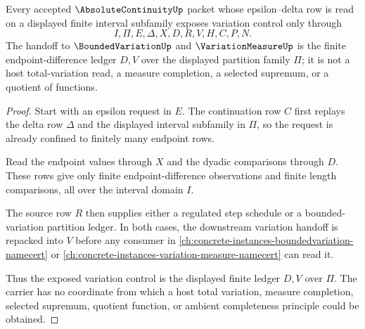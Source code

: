 \begin{theorem}
\label{thm:absolute-continuity-finite-variation-control}
Every accepted $\AbsoluteContinuityUp$ packet whose epsilon--delta row is read on a displayed finite interval subfamily exposes variation control only through
$$
I,\Pi,E,\Delta,X,D,R,V,H,C,P,N .
$$
The handoff to $\BoundedVariationUp$ and $\VariationMeasureUp$ is the finite endpoint-difference ledger $D,V$ over the displayed partition family $\Pi$; it is not a host total-variation read, a measure completion, a selected supremum, or a quotient of functions.
\end{theorem}
\begin{proof}
Start with an epsilon request in $E$. The continuation row $C$ first replays the delta row $\Delta$ and the displayed interval subfamily in $\Pi$, so the request is already confined to finitely many endpoint rows.

Read the endpoint values through $X$ and the dyadic comparisons through $D$. These rows give only finite endpoint-difference observations and finite length comparisons, all over the interval domain $I$.

The source row $R$ then supplies either a regulated step schedule or a bounded-variation partition ledger. In both cases, the downstream variation handoff is repacked into $V$ before any consumer in \autoref{ch:concrete-instances-boundedvariation-namecert} or \autoref{ch:concrete-instances-variation-measure-namecert} can read it.

Thus the exposed variation control is the displayed finite ledger $D,V$ over $\Pi$. The carrier has no coordinate from which a host total variation, measure completion, selected supremum, quotient function, or ambient completeness principle could be obtained.
\end{proof}

